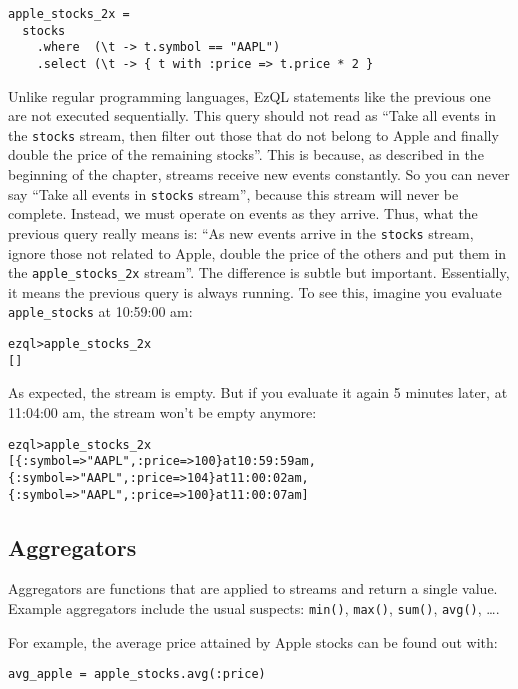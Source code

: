 \documentclass{report}
\newenvironment{evaluation}
{
  \framed
  \begin{alltt}
}
{
  \end{alltt}
  \endframed
}
\begin{document}
\begin{verbatim}
apple_stocks_2x =
  stocks
    .where  (\t -> t.symbol == "AAPL")
    .select (\t -> { t with :price => t.price * 2 }
\end{verbatim}

Unlike regular programming languages, EzQL statements like the
previous one are not executed sequentially. This query should not read
as ``Take all events in the \verb=stocks= stream, then filter out
those that do not belong to Apple and finally double the price of the
remaining stocks''. This is because, as described in the beginning of
the chapter, streams receive new events constantly. So you can never
say ``Take all events in \verb=stocks= stream'', because this stream
will never be complete. Instead, we must operate on events as they
arrive. Thus, what the previous query really means is: ``As new events
arrive in the \verb=stocks= stream, ignore those not related to Apple,
double the price of the others and put them in the
\verb=apple_stocks_2x= stream''. The difference is subtle but
important. Essentially, it means the previous query is always
running. To see this, imagine you evaluate \verb=apple_stocks= at
10:59:00 am:

\begin{evaluation}
ezql> apple_stocks_2x
[]
\end{evaluation}

As expected, the stream is empty. But if you evaluate it again 5
minutes later, at 11:04:00 am, the stream won't be empty anymore:

\begin{evaluation}
ezql> apple_stocks_2x
[\{ :symbol => "AAPL", :price => 100 \} at 10:59:59 am,
 \{ :symbol => "AAPL", :price => 104 \} at 11:00:02 am,
 \{ :symbol => "AAPL", :price => 100 \} at 11:00:07 am]
\end{evaluation}

\subsection{Aggregators}
\label{sec:aggregators}

Aggregators are functions that are applied to streams and return a
single value. Example aggregators include the usual suspects:
\verb=min()=, \verb=max()=, \verb=sum()=, \verb=avg()=, \ldots.

For example, the average price attained by Apple stocks can be
found out with:

\begin{verbatim}
avg_apple = apple_stocks.avg(:price)
\end{verbatim}
\end{document}
